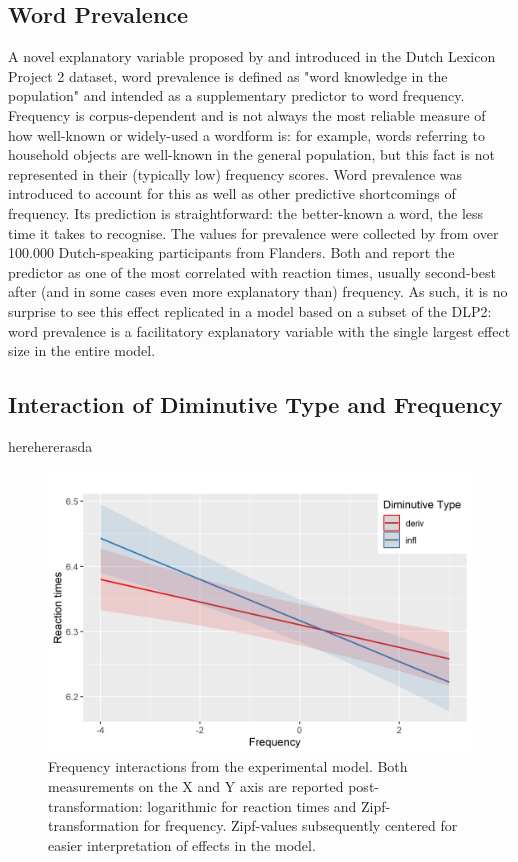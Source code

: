 \subsection{Word Prevalence} \label{subsec:prevalence}
A novel explanatory variable proposed by \cite{Keuleers+etal+2015} and introduced in the Dutch Lexicon Project 2 dataset, word prevalence is defined as "word knowledge in the population" \parencite{Brysbaert+etal+2016} and intended as a supplementary predictor to word frequency. Frequency is corpus-dependent and is not always the most reliable measure of how well-known or widely-used a wordform is: for example, words referring to household objects are well-known in the general population, but this fact is not represented in their (typically low) frequency scores. Word prevalence was introduced to account for this as well as other predictive shortcomings of frequency. Its prediction is straightforward: the better-known a word, the less time it takes to recognise. The values for prevalence were collected by \cite{Keuleers+etal+2015} from over 100.000 Dutch-speaking participants from Flanders. Both \cite{Keuleers+etal+2015} and \cite{Brysbaert+etal+2016} report the predictor as one of the most correlated with reaction times, usually second-best after (and in some cases even more explanatory than) frequency. As such, it is no surprise to see this effect replicated in a model based on a subset of the DLP2: word prevalence is a facilitatory explanatory variable with the single largest effect size in the entire model.
\subsection{Interaction of Diminutive Type and Frequency} \label{subsec:interaction}
herehererasda
\begin{figure}[h]
    \centering
    \includegraphics[width=\textwidth]{images/mod_int.png}
    \caption[Frequency interactions from the experimental model]{Frequency interactions from the experimental model. Both measurements on the X and Y axis are reported post-transformation: logarithmic for reaction times and Zipf-transformation for frequency. Zipf-values subsequently centered for easier interpretation of effects in the model.}
    \label{fig:interaction}
\end{figure}
